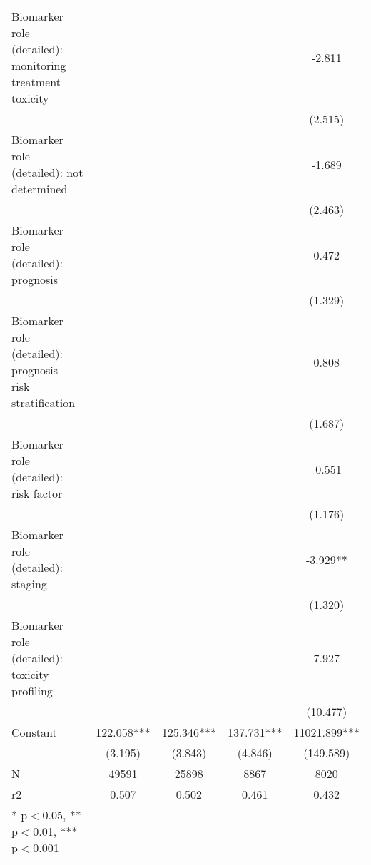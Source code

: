 \begin{table}[htb]
\begin{tabular}{l*{4}c}
Biomarker role (detailed): monitoring treatment toxicity&               &               &               &      -2.811   \\
                    &               &               &               &     (2.515)   \\
Biomarker role (detailed): not determined&               &               &               &      -1.689   \\
                    &               &               &               &     (2.463)   \\
Biomarker role (detailed): prognosis&               &               &               &       0.472   \\
                    &               &               &               &     (1.329)   \\
Biomarker role (detailed): prognosis - risk stratification&               &               &               &       0.808   \\
                    &               &               &               &     (1.687)   \\
Biomarker role (detailed): risk factor&               &               &               &      -0.551   \\
                    &               &               &               &     (1.176)   \\
Biomarker role (detailed): staging&               &               &               &      -3.929** \\
                    &               &               &               &     (1.320)   \\
Biomarker role (detailed): toxicity profiling&               &               &               &       7.927   \\
                    &               &               &               &    (10.477)   \\
Constant            &     122.058***&     125.346***&     137.731***&   11021.899***\\
                    &     (3.195)   &     (3.843)   &     (4.846)   &   (149.589)   \\
N                   &       49591   &       25898   &        8867   &        8020   \\
r2                  &       0.507   &       0.502   &       0.461   &       0.432   \\
* p$<$0.05, ** p$<$0.01, *** p$<$0.001 \\

\end{tabular}
\end{table}

